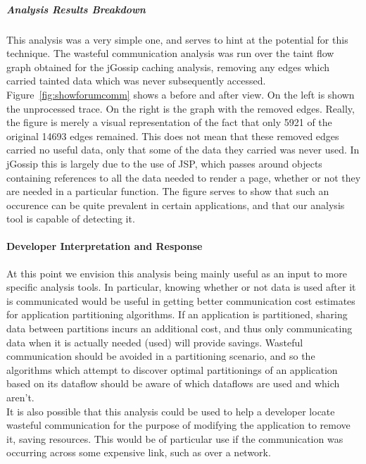 \documentclass[msc,oneside]{ubcthesis}
\begin{document}
\subparagraph{Analysis Results Breakdown}
This analysis was a very simple one, and serves to hint at the potential for this technique. The wasteful communication analysis was run over the taint flow graph obtained for the jGossip caching analysis, removing any edges which carried tainted data which was never subsequently accessed. Figure~\ref{fig:showforumcomm} shows a before and after view. On the left is shown the unprocessed trace. On the right is the graph with the removed edges. Really, the figure is merely a visual representation of the fact that only 5921 of the original 14693 edges remained. This does not mean that these removed edges carried no useful data, only that some of the data they carried was never used. In jGossip this is largely due to the use of JSP, which passes around objects containing references to all the data needed to render a page, whether or not they are needed in a particular function. The figure serves to show that such an occurence can be quite prevalent in certain applications, and that our analysis tool is capable of detecting it.

\paragraph{Developer Interpretation and Response}
At this point we envision this analysis being mainly useful as an input to more specific analysis tools. In particular, knowing whether or not data is used after it is communicated would be useful in getting better communication cost estimates for application partitioning algorithms. If an application is partitioned, sharing data between partitions incurs an additional cost, and thus only communicating data when it is actually needed (used) will provide savings. Wasteful communication should be avoided in a partitioning scenario, and so the algorithms which attempt to discover optimal partitionings of an application based on its dataflow should be aware of which dataflows are used and which aren't.\\

It is also possible that this analysis could be used to help a developer locate wasteful communication for the purpose of modifying the application to remove it, saving resources. This would be of particular use if the communication was occurring across some expensive link, such as over a network.


\end{document}
